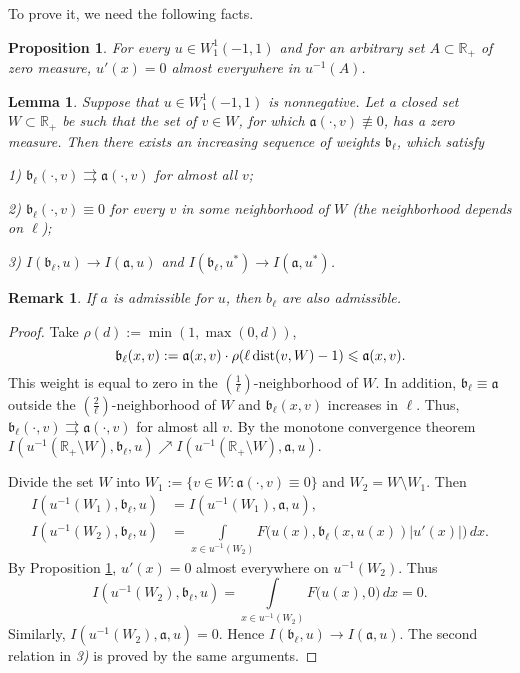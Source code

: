 \documentclass[12pt]{article}
\newcommand{\Real}{\mathbb R}
\renewcommand{\le}{\leqslant}
\newtheorem{prop}{Proposition}
\newtheorem{lm}{Lemma}
\newtheorem{rem}{Remark}
\newcommand{\W}{W_1^1}
\newcommand{\dist}{\mathop{\rm dist}\nolimits}
\begin{document}
To prove it, we need the following facts.

\begin{prop}
\label{levelDerivative}
{\rm \cite[Theorem 6.19]{LL} }
For every $u \in \W(-1, 1)$ and for an arbitrary set $A \subset \Real_+$ of zero measure,
$u'(x) = 0$ almost everywhere in $u^{-1}(A)$.
\end{prop}

\begin{lm}
\label{zeroApprox}
Suppose that $u \in \W(-1, 1)$ is nonnegative.
Let a closed set $W \subset \Real_+$ be such that
the set of $v \in W$, for which $\mathfrak a(\cdot, v) \not\equiv 0$, has a zero measure.
Then there exists an increasing sequence of weights $\mathfrak b_{\ell}$, which satisfy

1) $\mathfrak b_{\ell}(\cdot, v) \rightrightarrows \mathfrak a(\cdot, v)$ for almost all $v$;

2) $\mathfrak b_{\ell}(\cdot, v) \equiv 0$ for every $v$ in some neighborhood of $W$ (the neighborhood depends on $\ell$);

3) $I(\mathfrak b_{\ell}, u) \to I(\mathfrak a, u)$ and $I(\mathfrak b_{\ell}, u^*) \to I(\mathfrak a, u^*)$.
\end{lm}

\begin{rem}
If $a$ is admissible for $u$, then $b_{\ell}$ are also admissible.
\end{rem}

\begin{proof}
Take $\rho(d) := \min(1, \max(0, d))$,
$$\mathfrak b_{\ell}(x, v) := \mathfrak a(x, v) \cdot \rho(\ell \dist(v, W) - 1) \le \mathfrak a(x, v).$$
This weight is equal to zero in the $\left(\frac{1}{\ell}\right)$-neighborhood of $W$.
In addition, $\mathfrak b_{\ell} \equiv \mathfrak a$ outside the $\left(\frac{2}{\ell}\right)$-neighborhood of $W$ and
$\mathfrak b_{\ell}(x, v)$ increases in $\ell$.
Thus, $\mathfrak b_{\ell}(\cdot, v) \rightrightarrows \mathfrak a(\cdot, v)$ for almost all $v$.
By the monotone convergence theorem
$I(u^{-1}(\Real_+ \setminus W), \mathfrak b_{\ell}, u) \nearrow I(u^{-1}(\Real_+ \setminus W), \mathfrak a, u)$.

Divide the set $W$ into $W_1 := \{v \in W: \mathfrak a(\cdot, v) \equiv 0\}$ and $W_2 = W \setminus W_1$.
Then
$$
\begin{aligned}
I(u^{-1}(W_1), \mathfrak b_{\ell}, u) &= I(u^{-1}(W_1), \mathfrak a, u),\\
I(u^{-1}(W_2), \mathfrak b_{\ell}, u) &= \int\limits_{x \in u^{-1}(W_2)} F\big(u(x), \mathfrak b_{\ell}(x, u(x)) |u'(x)|\big) \, dx.
\end{aligned}
$$
By Proposition \ref{levelDerivative}, $u'(x) = 0$ almost everywhere on $u^{-1}(W_2)$.
Thus
$$I(u^{-1}(W_2), \mathfrak b_{\ell}, u) = \int\limits_{x \in u^{-1}(W_2)} F\big(u(x), 0\big) \, dx = 0.$$
Similarly, $I(u^{-1}(W_2), \mathfrak a, u) = 0$. Hence $I(\mathfrak b_{\ell}, u) \to I(\mathfrak a, u)$.
The second relation in {\it 3)} is proved by the same arguments.
\end{proof}
\end{document}
